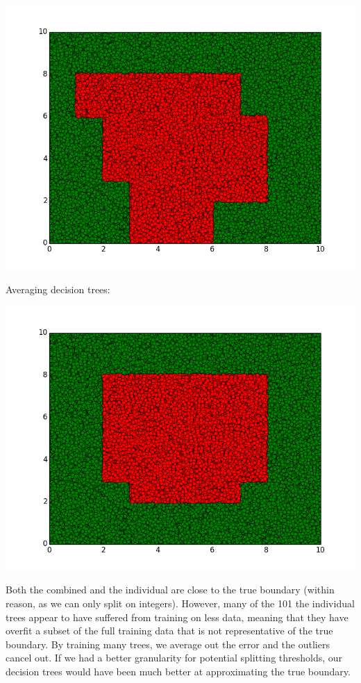 \documentclass{article}
\begin{document}
\begin{enumerate}[(a)]
\includegraphics[scale=.5]{2b-herp2.png}

Averaging decision trees:

\includegraphics[scale=.5]{2b.png}

Both the combined and the individual are close to the true boundary (within reason, as we can only split on integers). However, many of the 101 the individual trees appear to have suffered from training on less data, meaning that they have overfit a subset of the full training data that is not representative of the true boundary. By training many trees, we average out the error and the outliers cancel out. If we had a better granularity for potential splitting thresholds, our decision trees would have been much better at approximating the true boundary.


\end{enumerate}
\end{document}
